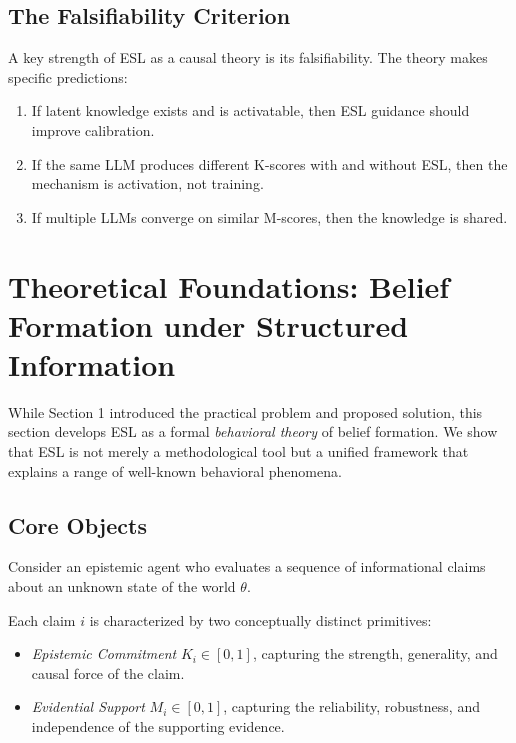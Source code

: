 \documentclass[11pt,a4paper]{article}
\begin{document}
\subsection{The Falsifiability Criterion}

A key strength of ESL as a causal theory is its falsifiability. The theory makes specific predictions:
\begin{enumerate}
    \item If latent knowledge exists and is activatable, then ESL guidance should improve calibration.
    \item If the same LLM produces different K-scores with and without ESL, then the mechanism is activation, not training.
    \item If multiple LLMs converge on similar M-scores, then the knowledge is shared.
\end{enumerate}



\section{Theoretical Foundations: Belief Formation under Structured Information}
\label{sec:theory}

While Section 1 introduced the practical problem and proposed solution, this section develops ESL as a formal \emph{behavioral theory} of belief formation. We show that ESL is not merely a methodological tool but a unified framework that explains a range of well-known behavioral phenomena.

\subsection{Core Objects}

Consider an epistemic agent who evaluates a sequence of informational claims about an unknown state of the world $\theta$.

Each claim $i$ is characterized by two conceptually distinct primitives:
\begin{itemize}
    \item \emph{Epistemic Commitment} $K_i \in [0,1]$, capturing the strength, generality, and causal force of the claim.
    \item \emph{Evidential Support} $M_i \in [0,1]$, capturing the reliability, robustness, and independence of the supporting evidence.
\end{itemize}
\end{document}
